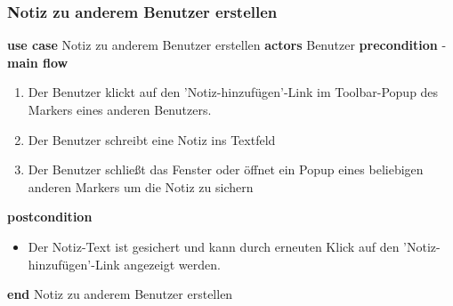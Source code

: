 \subsubsection{Notiz zu anderem Benutzer erstellen}\label{subsubsec:uc_usernote}
\noindent \textbf{use case} Notiz zu anderem Benutzer erstellen \newline
\indent \textbf{actors} \newline
\indent \indent Benutzer \newline
\indent \textbf{precondition} \newline
\indent \indent - \newline
\indent \textbf{main flow}
\begin{enumerate}[labelwidth=0pt,leftmargin=39pt,noitemsep,topsep=0pt,parsep=0pt,partopsep=0pt]
\item Der Benutzer klickt auf den 'Notiz-hinzufügen'-Link im Toolbar-Popup des Markers eines anderen Benutzers.
\item Der Benutzer schreibt eine Notiz ins Textfeld
\item Der Benutzer schließt das Fenster oder öffnet ein Popup eines beliebigen anderen Markers um die Notiz zu sichern
\end{enumerate}
\indent \indent \textbf{postcondition}
\begin{itemize}[label={},labelwidth=0pt,leftmargin=24pt,noitemsep,topsep=0pt,parsep=0pt,partopsep=0pt]
\item Der Notiz-Text ist gesichert und kann durch erneuten Klick  auf den 'Notiz-hinzufügen'-Link angezeigt werden.
\end{itemize}
\noindent \textbf{end} Notiz zu anderem Benutzer erstellen \newline

